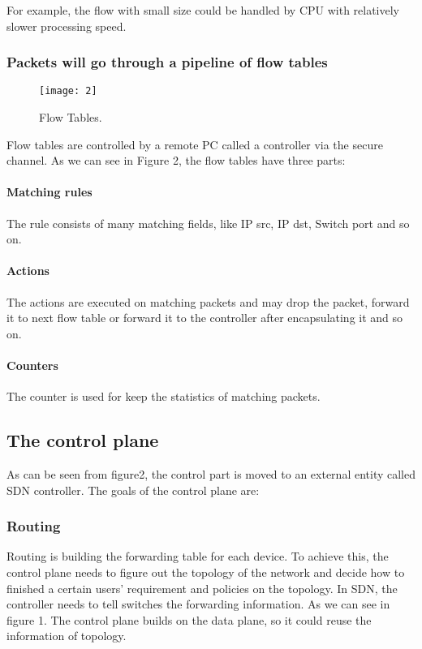 \documentclass[conference]{IEEEtran}
\begin{document}
For example, the flow with small size could be handled by CPU with relatively slower processing speed.


\subsubsection{Packets will go through a pipeline of flow tables}
\begin{figure}[!t]
\centering
\texttt{[image: 2]}
\caption{Flow Tables.}
\label{fig_sim}
\end{figure}
Flow tables are controlled by a remote PC called a   controller via the secure channel. As we can see in Figure 2, the flow tables have three parts: 

\paragraph{Matching rules}
The rule consists of many matching fields, like IP src, IP dst, Switch port and so on.
\paragraph{Actions}
The actions are executed on matching packets and may drop the packet, forward it to next flow table or forward it to the controller after encapsulating it and so on.
\paragraph{Counters}
The counter is used for keep the statistics of matching packets.
\subsection{The control plane}
As can be seen from figure2, the control part is moved to an external entity called SDN controller. The goals of the control plane are:
\subsubsection{Routing}
Routing is building the forwarding table for each device. To achieve this, the control plane needs to figure out the topology of the network and decide how to finished a certain users’ requirement and policies on the topology. In SDN, the controller needs to tell switches the forwarding information. As we can see in figure 1. The control plane builds on the data plane, so it could reuse the information of topology.
\end{document}
